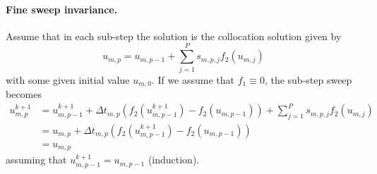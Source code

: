 \documentclass{article}
\begin{document}
\paragraph{Fine sweep invariance.}
Assume that in each sub-step the solution is the collocation solution given by
\begin{equation}
	u_{m,p} = u_{m,p-1} + \sum_{j=1}^{P} s_{m,p,j} f_2(u_{m,j})
\end{equation}
with some given initial value $u_{m,0}$.
If we assume that $f_1 \equiv 0$, the sub-step sweep becomes
\begin{align*}
	u^{k+1}_{m,p} &= u^{k+1}_{m,p-1} + \Delta t_{m,p} \left( f_2(u^{k+1}_{m,p-1}) - f_2(u_{m,p-1}) \right) + \sum_{j=1}^{P} s_{m,p,j} f_2(u_{m,j}) \\
				  &= u_{m,p}  + \Delta t_{m,p} \left( f_2(u^{k+1}_{m,p-1}) - f_2(u_{m,p-1}) \right) \\
				  &= u_{m,p}
\end{align*}
assuming that $u^{k+1}_{m,p-1} = u_{m,p-1}$ (induction).

\end{document}

